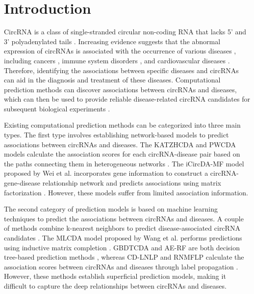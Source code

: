 \documentclass[journal=jcisd8,manuscript=article]{achemso}
\begin{document}
\section{Introduction}
\vspace{-0.3cm}
CircRNA is a class of single-stranded circular non-coding RNA that lacks 5' and 3' polyadenylated tails \cite{jeck2014detecting}. Increasing evidence suggests that the abnormal expression of circRNAs is associated with the occurrence of various diseases \cite{abdelmohsen2017identification}, including cancers \cite{gao2019circular, li2019tumor, liang2020autophagy}, immune system disorders \cite{wang2018circibtk}, and cardiovascular diseases \cite{khan2016rbm20, siede2017identification, jin2019silencing}. Therefore, identifying the associations between specific diseases and circRNAs can aid in the diagnosis and treatment of these diseases. Computational prediction methods can discover associations between circRNAs and diseases, which can then be used to provide reliable disease-related circRNA candidates for subsequent biological experiments \cite{lan2023benchmarking, yang2021predicting}.

Existing computational prediction methods can be categorized into three main types. The first type involves establishing network-based models to predict associations between circRNAs and diseases. The KATZHCDA and PWCDA models calculate the association scores for each circRNA-disease pair based on the paths connecting them in heterogeneous networks \cite{fan2018prediction, lei2018pwcda}. The iCircDA-MF model proposed by Wei et al. incorporates gene information to construct a circRNA-gene-disease relationship network and predicts associations using matrix factorization \cite{wei2020icircda}. However, these models suffer from limited association information.

The second category of prediction models is based on machine learning techniques to predict the associations between circRNAs and diseases. A couple of methods combine k-nearest neighbors to predict disease-associated circRNA candidates \cite{wang2022combining, lei2020integrating, yan2018dwnn}. The MLCDA model proposed by Wang et al. performs predictions using inductive matrix completion \cite{wang2022machine}. GBDTCDA and AE-RF are both decision tree-based prediction methods \cite{lei2019gbdtcda, deepthi2021inferring}, whereas CD-LNLP and RNMFLP calculate the association scores between circRNAs and diseases through label propagation \cite{zhang2019predicting, peng2022rnmflp}. However, these methods establish superficial prediction models, making it difficult to capture the deep relationships between circRNAs and diseases.
\end{document}
